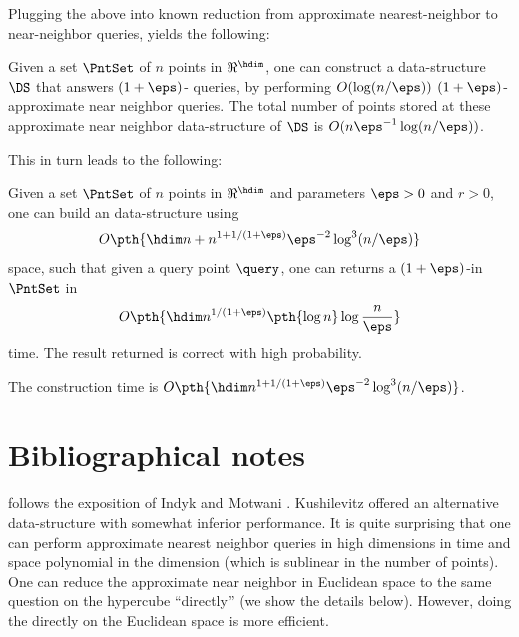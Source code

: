 Plugging the above into known reduction from approximate  nearest-neighbor to
near-neighbor queries, yields the following:

\begin{corollary}
    Given a set $\PntSet$ of $n$ points in $\Re^\hdim$, one can
    construct a data-structure $\DS$ that answers $(1+\eps)$-\ANNbr
    queries, by performing $O( \log(n/\eps) )$ $(1+\eps)$-approximate
    near neighbor queries. The total number of points stored at these
    approximate near neighbor data-structure of $\DS$ is $O( n
    \eps^{-1} \log(n/\eps))$.
\end{corollary}

This in turn leads to the following:

\begin{theorem}%
    Given a set $\PntSet$ of $n$ points in $\Re^\hdim$ and parameters
    $\eps>0$ and $r > 0$, one can build an \ANNbr data-structure using
    \begin{align*}
        O\pth{\hdim n + n^{1+1/(1+\eps)} \eps^{-2} \log^3 (n/\eps) }
    \end{align*}
    space, such that given a query point $\query$, one can returns a
    $(1+\eps)$-\ANNbr in $\PntSet$ in
    \begin{align*}
        O\pth{ \hdim n^{1/(1+\eps)} \pth{\log n} \log \frac{n}{\eps}}
    \end{align*}
    time. The result returned is correct with high probability.

    The construction time is $O\pth{\hdim n^{1+1/(1+\eps)} \eps^{-2}
       \log^3 (n/\eps) }$.
\end{theorem}








\section{Bibliographical notes} 

 follows the exposition of Indyk and
Motwani \cite{im-anntr-98}.  Kushilevitz \etal \cite{kor-esann-00}
offered an alternative data-structure with somewhat inferior
performance. It is quite surprising that one can perform approximate
nearest neighbor queries in high dimensions in time and space
polynomial in the dimension (which is sublinear in the number of
points). One can reduce the approximate near neighbor in Euclidean
space to the same question on the hypercube ``directly'' (we show the
details below). However, doing the \LSH directly on the Euclidean
space is more efficient.

